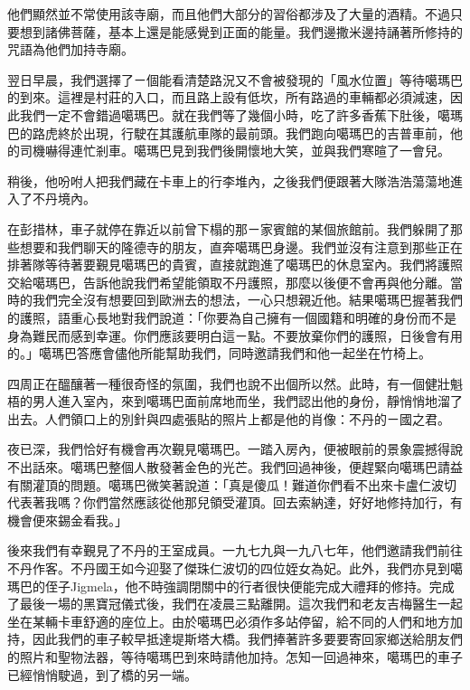 他們顯然並不常使用該寺廟，而且他們大部分的習俗都涉及了大量的酒精。不過只要想到諸佛菩薩，基本上還是能感覺到正面的能量。我們邊撒米邊持誦著所修持的咒語為他們加持寺廟。

翌日早晨，我們選擇了ㄧ個能看清楚路況又不會被發現的「風水位置」等待噶瑪巴的到來。這裡是村莊的入口，而且路上設有低坎，所有路過的車輛都必須減速，因此我們一定不會錯過噶瑪巴。就在我們等了幾個小時，吃了許多香蕉下肚後，噶瑪巴的路虎終於出現，行駛在其護航車隊的最前頭。我們跑向噶瑪巴的吉普車前，他的司機嚇得連忙剎車。噶瑪巴見到我們後開懷地大笑，並與我們寒暄了一會兒。

稍後，他吩咐人把我們藏在卡車上的行李堆內，之後我們便跟著大隊浩浩蕩蕩地進入了不丹境內。

在彭措林，車子就停在靠近以前曾下榻的那ㄧ家賓館的某個旅館前。我們躲開了那些想要和我們聊天的隆德寺的朋友，直奔噶瑪巴身邊。我們並沒有注意到那些正在排著隊等待著要覲見噶瑪巴的貴賓，直接就跑進了噶瑪巴的休息室內。我們將護照交給噶瑪巴，告訴他說我們希望能領取不丹護照，那麼以後便不會再與他分離。當時的我們完全沒有想要回到歐洲去的想法，一心只想親近他。結果噶瑪巴握著我們的護照，語重心長地對我們說道：「你要為自己擁有一個國籍和明確的身份而不是身為難民而感到幸運。你們應該要明白這ㄧ點。不要放棄你們的護照，日後會有用的。」噶瑪巴答應會儘他所能幫助我們，同時邀請我們和他一起坐在竹椅上。

四周正在醞釀著一種很奇怪的氛圍，我們也說不出個所以然。此時，有一個健壯魁梧的男人進入室內，來到噶瑪巴面前席地而坐，我們認出他的身份，靜悄悄地溜了出去。人們領口上的別針與四處張貼的照片上都是他的肖像：不丹的ㄧ國之君。

夜已深，我們恰好有機會再次覲見噶瑪巴。一踏入房內，便被眼前的景象震撼得說不出話來。噶瑪巴整個人散發著金色的光芒。我們回過神後，便趕緊向噶瑪巴請益有關灌頂的問題。噶瑪巴微笑著說道：「真是傻瓜！難道你們看不出來卡盧仁波切代表著我嗎？你們當然應該從他那兒領受灌頂。回去索納達，好好地修持加行，有機會便來錫金看我。」

後來我們有幸覲見了不丹的王室成員。一九七九與一九八七年，他們邀請我們前往不丹作客。不丹國王如今迎娶了傑珠仁波切的四位姪女為妃。此外，我們亦見到噶瑪巴的侄子Jigmela，他不時強調閉關中的行者很快便能完成大禮拜的修持。完成了最後一場的黑寶冠儀式後，我們在凌晨三點離開。這次我們和老友吉梅醫生一起坐在某輛卡車舒適的座位上。由於噶瑪巴必須作多站停留，給不同的人們和地方加持，因此我們的車子較早抵達堤斯塔大橋。我們捧著許多要要寄回家鄉送給朋友們的照片和聖物法器，等待噶瑪巴到來時請他加持。怎知一回過神來，噶瑪巴的車子已經悄悄駛過，到了橋的另一端。

